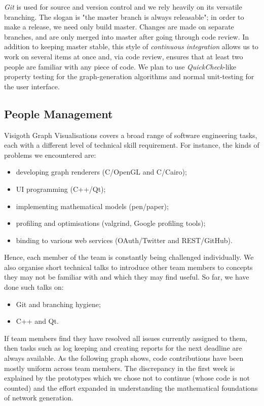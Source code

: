 \documentclass[a4paper,11pt,titlepage]{article}
\newcommand{\buzz}[1]{\emph{#1}}
\begin{document}
\buzz{Git} is used for source and version control and we rely heavily on its versatile branching.  The slogan is "the master branch is always releasable"; in order to make a release, we need only build master. Changes are made on separate branches, and are only merged into master after going through code review. In addition to keeping master stable, this style of \buzz{continuous integration} allows us to work on several items at once and, via code review, ensures that at least two people are familiar with any piece of code. We plan to use \buzz{QuickCheck}-like property testing for the graph-generation algorithms and normal unit-testing for the user interface.


\subsection{People Management}

Visigoth Graph Visualisations covers a broad range of software engineering tasks, each with a different level of technical skill requirement. For instance, the kinds of problems we encountered are:
\begin{itemize}
	\item developing graph renderers (C/OpenGL and C/Cairo);
	\item UI programming (C++/Qt);
	\item implementing mathematical models (pen/paper);
	\item profiling and optimisations (valgrind, Google profiling tools);
	\item binding to various web services (OAuth/Twitter and REST/GitHub).
\end{itemize}

Hence, each member of the team is constantly being challenged individually. We also organise short technical talks to introduce other team members to concepts they may not be familiar with and which they may find useful. So far, we have done such talks on:
\begin{itemize}
	\item Git and branching hygiene;
	\item C++ and Qt.
\end{itemize}
If team members find they have resolved all issues currently assigned to them, then tasks such as log keeping and creating reports for the next deadline are always available.
As the following graph shows, code contributions have been mostly uniform across team members. The discrepancy in the first week is explained by the prototypes which we chose not to continue (whose code is not counted) and the effort expanded in understanding the mathematical foundations of network generation.
\end{document}
